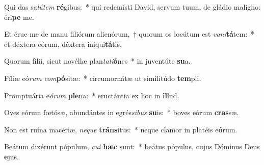 \item Qui das sa\textit{lú}\textit{tem} \textbf{ré}gibus:~* qui redemísti David, servum tuum, de gládio malígno: éri\textbf{pe} me.
\item Et érue me de manu filiórum alienórum,~† quorum os locútum est \textit{va}\textit{ni}\textbf{tá}tem:~* et déxtera eórum, déxtera iniqui\textbf{tá}tis.
\item Quorum fílii, sicut novéllæ plan\textit{ta}\textit{ti}\textbf{ó}nes~* in juventúte \textbf{su}a.
\item Fíliæ eó\textit{rum} \textit{com}\textbf{pó}sitæ:~* circumornátæ ut similitúdo \textbf{tem}pli.
\item Promptuária e\textit{ó}\textit{rum} \textbf{ple}na:~* eructántia ex hoc in \textbf{il}lud.
\item Oves eórum fœtósæ, abundántes in egrés\textit{si}\textit{bus} \textbf{su}is:~* boves eórum \textbf{cras}sæ.
\item Non est ruína macériæ, \textit{ne}\textit{que} \textbf{tráns}itus:~* neque clamor in platéis e\textbf{ó}rum.
\item Beátum dixérunt pópulum, \textit{cu}\textit{i} \textbf{hæc} sunt:~* beátus pópulus, cujus Dóminus Deus \textbf{e}jus.
